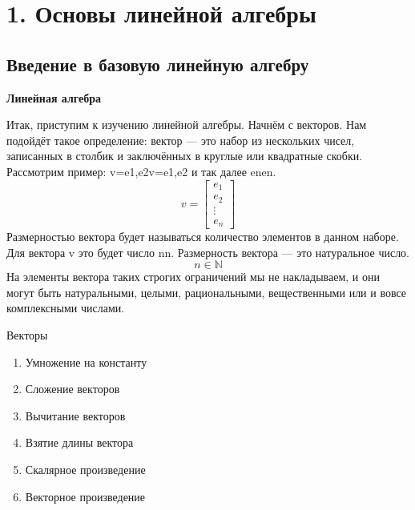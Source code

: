 




\section{1. Основы линейной алгебры}
\subsection{
Введение в базовую линейную алгебру
}

\textbf{Линейная алгебра}

Итак, приступим к изучению линейной алгебры. Начнём с векторов.
Нам подойдёт такое определение: вектор --- это набор из нескольких чисел, 
записанных в столбик и заключённых в круглые или квадратные скобки.
Рассмотрим пример: v=e1,e2v=e1​,e2​ и так далее enen​.
$$
v = \begin{bmatrix}
e_{1}\\
e_{2}\\
\vdots\\
e_{n}
\end{bmatrix}
$$
Размерностью вектора будет называться количество элементов в данном наборе.
Для вектора v это будет число nn.
Размерность вектора — это натуральное число.
\begin{equation}
n \in \mathbb{N}
\end{equation}
На элементы вектора таких строгих ограничений мы не накладываем, и они могут быть натуральными, целыми, рациональными, вещественными или и вовсе комплексными числами.

Векторы

\begin{enumerate}
\item Умножение на константу
\item Сложение векторов
\item Вычитание векторов
\item Взятие длины вектора
\item Скалярное произведение
\item Векторное произведение
\end{enumerate}

